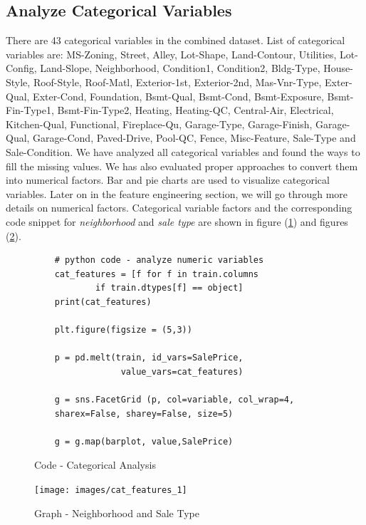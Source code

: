 \documentclass[sigconf]{acmart}
\begin{document}
	\subsection{Analyze Categorical Variables}
	There are 43 categorical variables in the combined dataset. List of categorical variables are: MS-Zoning, Street, Alley, Lot-Shape, Land-Contour, Utilities, Lot-Config, Land-Slope, Neighborhood, Condition1, Condition2, Bldg-Type, House-Style, Roof-Style, Roof-Matl, Exterior-1st, Exterior-2nd, Mas-Vnr-Type, Exter-Qual, Exter-Cond, Foundation, Bsmt-Qual, Bsmt-Cond, Bsmt-Exposure, Bsmt-Fin-Type1, Bsmt-Fin-Type2, Heating, Heating-QC, Central-Air, Electrical, Kitchen-Qual, Functional, Fireplace-Qu, Garage-Type, Garage-Finish, Garage-Qual, Garage-Cond, Paved-Drive, Pool-QC, Fence, Misc-Feature, Sale-Type and Sale-Condition. We have analyzed all categorical variables and found the ways to fill the missing values. We has also evaluated proper approaches to convert them into numerical factors. Bar and pie charts are used to visualize categorical variables. Later on in the feature engineering section, we will go through more details on numerical factors. Categorical variable factors and the corresponding code snippet for {\em neighborhood} and {\em sale type} are shown in figure (\ref{c:analyze-cat}) and figures (\ref{fig:cat_features_1}).
	
	\begin{figure}[htb]
	\begin{verbatim}	
	# python code - analyze numeric variables
	cat_features = [f for f in train.columns 
			if train.dtypes[f] == object]
	print(cat_features)
	
	plt.figure(figsize = (5,3))
	
	p = pd.melt(train, id_vars=SalePrice,
	             value_vars=cat_features)
	             
	g = sns.FacetGrid (p, col=variable, col_wrap=4, 
	sharex=False, sharey=False, size=5)
	
	g = g.map(barplot, value,SalePrice)				
	\end{verbatim}
	\caption{Code - Categorical Analysis} \label{c:analyze-cat} 
	\end{figure}

\begin{figure}[htb]
	\centering
	\texttt{[image: images/cat\_features\_1]}	
	\caption{Graph - Neighborhood and Sale Type} \label{fig:cat_features_1} 
\end{figure}
	
\end{document}
